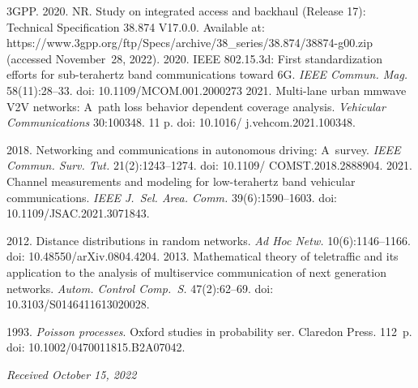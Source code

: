 \begin{multicols}{2}
{{\begin{thebibliography}{99}
  3GPP. 2020. NR. Study on integrated access and backhaul (Release 17): Technical Specification 38.874 
V17.0.0. Available at: 
{\sf https://www.3gpp.org/ftp/Specs/\linebreak archive/38\_series/38.874/38874-g00.zip} (accessed 
November~28, 2022).
   2020. IEEE 802.15.3d: First standardization 
efforts for sub-terahertz band communications toward 6G. \textit{IEEE Commun. 
Mag.} 58(11):28--33. doi: 10.1109/MCOM.001.2000273
   2021. Multi-lane urban 
mmwave V2V networks: A~path loss behavior dependent coverage analysis. \textit{Vehicular 
Communications} 30:100348. 11 p. doi: 10.1016/ j.vehcom.2021.100348.


   2018. Networking and communications in autonomous 
driving: A~survey. \textit{IEEE Commun. Surv. Tut.} 21(2):1243--1274. doi: 
10.1109/ COMST.2018.2888904.
 2021. 
Channel measurements and modeling for low-terahertz band vehicular communications. 
\textit{IEEE J.~Sel. Area. Comm.} 39(6):1590--1603. doi: 
10.1109/JSAC.2021.3071843.
  
 2012. Distance distributions in random networks. \textit{Ad Hoc 
Netw.} 10(6):1146--1166. doi: 10.48550/arXiv.0804.4204. 
 2013. Mathematical theory 
of teletraffic and its application to the analysis of multiservice communication of next generation 
networks. \textit{Autom. Control Comp.~S.} 47(2):62--69. doi: 10.3103/S0146411613020028.
  
   1993. \textit{Poisson processes}. Oxford studies in probability ser. Claredon Press. 112~p. 
doi: 10.1002/0470011815.B2A07042.

\end{thebibliography}

 }
 }

\end{multicols}

\vspace*{-6pt}

\hfill{\small\textit{Received October 15, 2022}}

\vspace*{-12pt}

